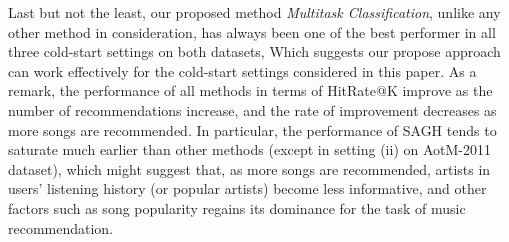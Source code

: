 Last but not the least, our proposed method {\it Multitask Classification}, unlike any other method in consideration,
has always been one of the best performer in all three cold-start settings on both datasets,
Which suggests our propose approach can work effectively for the cold-start settings considered in this paper.
As a remark, the performance of all methods in terms of HitRate@K improve as the number of recommendations increase,
and the rate of improvement decreases as more songs are recommended.
In particular, the performance of SAGH tends to saturate much earlier than other methods (except in setting (ii) on AotM-2011 dataset),
which might suggest that, as more songs are recommended, artists in users' listening history (or popular artists) become less informative,
and other factors such as song popularity regains its dominance for the task of music recommendation.



